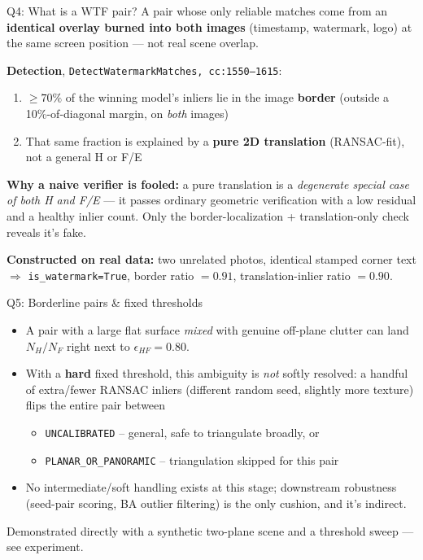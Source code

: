 \documentclass[11pt]{beamer}
\newcommand{\coderef}[1]{{\scriptsize\textcolor{blue!60!black}{\texttt{#1}}}}
\begin{document}
\begin{frame}[fragile]{Q4: What is a WTF pair?}
  A pair whose only reliable matches come from an \textbf{identical overlay burned into
  both images} (timestamp, watermark, logo) at the same screen position --- not real
  scene overlap.
  \vspace{0.2cm}

  \textbf{Detection}, \coderef{DetectWatermarkMatches, cc:1550--1615}:
  \begin{enumerate}
    \item $\geq 70\%$ of the winning model's inliers lie in the image \textbf{border}
          (outside a 10\%-of-diagonal margin, on \emph{both} images)
    \item That same fraction is explained by a \textbf{pure 2D translation} (RANSAC-fit),
          not a general H or F/E
  \end{enumerate}
  \textbf{Why a naive verifier is fooled:} a pure translation is a \emph{degenerate special
  case of both H and F/E} --- it passes ordinary geometric verification with a low
  residual and a healthy inlier count. Only the border-localization + translation-only
  check reveals it's fake.

  \vspace{0.2cm}
  \textbf{Constructed on real data:} two unrelated photos, identical stamped corner text
  $\Rightarrow$ \texttt{is\_watermark=True}, border ratio $=0.91$, translation-inlier ratio $=0.90$.
\end{frame}

\begin{frame}{Q5: Borderline pairs \& fixed thresholds}
  \begin{itemize}
    \item A pair with a large flat surface \emph{mixed} with genuine off-plane clutter can
          land $N_H/N_F$ right next to $\epsilon_{HF}=0.80$.
    \item With a \textbf{hard} fixed threshold, this ambiguity is \emph{not} softly resolved:
          a handful of extra/fewer RANSAC inliers (different random seed, slightly more
          texture) flips the entire pair between
          \begin{itemize}
            \item \texttt{UNCALIBRATED} -- general, safe to triangulate broadly, or
            \item \texttt{PLANAR\_OR\_PANORAMIC} -- triangulation skipped for this pair
          \end{itemize}
    \item No intermediate/soft handling exists at this stage; downstream robustness
          (seed-pair scoring, BA outlier filtering) is the only cushion, and it's indirect.
  \end{itemize}
  \vspace{0.2cm}
  Demonstrated directly with a synthetic two-plane scene and a threshold sweep --- see experiment.
\end{frame}
\end{document}
